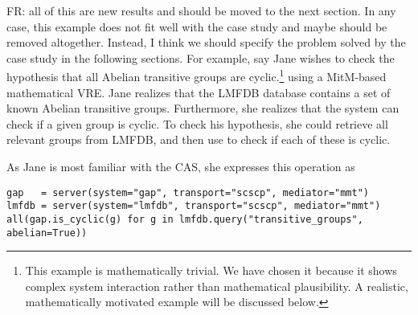\begin{oldpart}{FR: all of this are new results and should be moved to the next section. In any case, this example does not fit well with the case study and maybe should be removed altogether. Instead, I think we should specify the problem solved by the case study in the following sections.}
For example, say Jane wishes to check the hypothesis that all Abelian transitive groups are cyclic.\footnote{This example is mathematically trivial.
We have chosen it because it shows complex system interaction rather than mathematical plausibility.
A realistic, mathematically motivated example will be discussed below.}
using a MitM-based mathematical VRE.
Jane realizes that the LMFDB database contains a set of known Abelian transitive groups.
Furthermore, she realizes that the \GAP system can check if a given group is cyclic. 
To check his hypothesis, she could retrieve all relevant groups from LMFDB, and then use \GAP to check if each of these is cyclic. 

As Jane is most familiar with the \Sage CAS, she expresses this operation as
\begin{lstlisting}
gap   = server(system="gap", transport="scscp", mediator="mmt")
lmfdb = server(system="lmfdb", transport="scscp", mediator="mmt")
all(gap.is_cyclic(g) for g in lmfdb.query("transitive_groups", abelian=True))
\end{lstlisting}


\end{oldpart}

